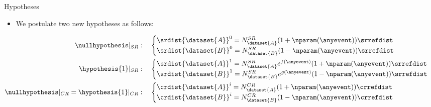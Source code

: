 \documentclass[notheorems]{beamer}
\begin{document}
\begin{frame}{Hypotheses}
    \begin{itemize}
        \item We postulate two new hypotheses as follows:
    \end{itemize}
    \begin{equation}
    \label{eq:hypothsis-formulation}
    \begin{aligned}
        \nullhypothesis |_{SR} &: \quad
        \begin{cases}
            {\srdist{\dataset{A}}^0} = N_\dataset{A}^{SR} (1 + {\nparam(\anyevent)}) \srrefdist \\
            {\srdist{\dataset{B}}^0} = N_\dataset{B}^{SR} (1 - {\nparam(\anyevent)}) \srrefdist
        \end{cases} \\
        \hypothesis{1} |_{SR} &: \quad
        \begin{cases}
            {\srdist{\dataset{A}}^1} = N_\dataset{A}^{SR} e^{f(\anyevent)} (1 + {\nparam(\anyevent)}) \srrefdist \\
            {\srdist{\dataset{B}}^1} = N_\dataset{B}^{SR} e^{g(\anyevent)} (1 - {\nparam(\anyevent)}) \srrefdist
        \end{cases} \\
        \nullhypothesis |_{CR} = \hypothesis{1} |_{CR} &: \quad
        \begin{cases}
            \crdist{\dataset{A}}^i = N_\dataset{A}^{CR} (1 + {\nparam(\anyevent)}) \crrefdist \\
            \crdist{\dataset{B}}^i = N_\dataset{B}^{CR} (1 - {\nparam(\anyevent)}) \crrefdist
        \end{cases}
    \end{aligned}
    \end{equation}
\end{frame}
\end{document}
